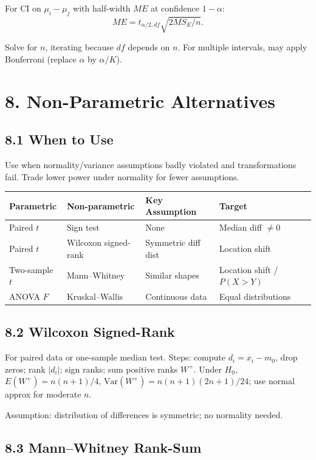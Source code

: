 \documentclass[9pt,letterpaper]{article}
\begin{document}
For CI on $\mu_i-\mu_j$ with half-width $ME$ at confidence $1-\alpha$:
\[
ME=t_{\alpha/2,df}\sqrt{2MS_E/n}.
\]

Solve for $n$, iterating because $df$ depends on $n$. For multiple intervals, may apply Bonferroni (replace $\alpha$ by $\alpha/K$).

\section{8. Non-Parametric Alternatives}

\subsection{8.1 When to Use}

Use when normality/variance assumptions badly violated and transformations fail. Trade lower power under normality for fewer assumptions.

\begin{center}\small
\begin{tabular}{@{}llll@{}}
\toprule
Parametric & Non-parametric & Key Assumption & Target \\
\midrule
Paired $t$ & Sign test & None & Median diff \(\neq0\) \\
Paired $t$ & Wilcoxon signed-rank & Symmetric diff dist & Location shift \\
Two-sample $t$ & Mann--Whitney & Similar shapes & Location shift / $P(X>Y)$ \\
ANOVA $F$ & Kruskal--Wallis & Continuous data & Equal distributions \\
\bottomrule
\end{tabular}
\end{center}

\subsection{8.2 Wilcoxon Signed-Rank}

For paired data or one-sample median test. Steps: compute $d_i=x_i-m_0$, drop zeros; rank $|d_i|$; sign ranks; sum positive ranks $W^+$. Under $H_0$, $E(W^+)=n(n+1)/4$, $\text{Var}(W^+)=n(n+1)(2n+1)/24$; use normal approx for moderate $n$.

Assumption: distribution of differences is symmetric; no normality needed.

\subsection{8.3 Mann--Whitney Rank-Sum}
\end{document}
